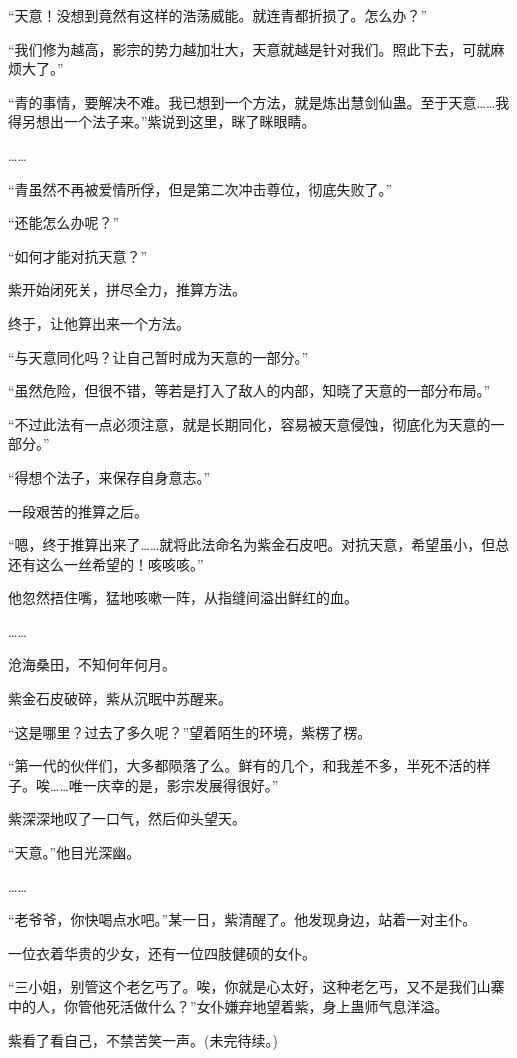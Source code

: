 \begin{this_body}
“天意！没想到竟然有这样的浩荡威能。就连青都折损了。怎么办？”

“我们修为越高，影宗的势力越加壮大，天意就越是针对我们。照此下去，可就麻烦大了。”

“青的事情，要解决不难。我已想到一个方法，就是炼出慧剑仙蛊。至于天意……我得另想出一个法子来。”紫说到这里，眯了眯眼睛。

……

“青虽然不再被爱情所俘，但是第二次冲击尊位，彻底失败了。”

“还能怎么办呢？”

“如何才能对抗天意？”

紫开始闭死关，拼尽全力，推算方法。

终于，让他算出来一个方法。

“与天意同化吗？让自己暂时成为天意的一部分。”

“虽然危险，但很不错，等若是打入了敌人的内部，知晓了天意的一部分布局。”

“不过此法有一点必须注意，就是长期同化，容易被天意侵蚀，彻底化为天意的一部分。”

“得想个法子，来保存自身意志。”

一段艰苦的推算之后。

“嗯，终于推算出来了……就将此法命名为紫金石皮吧。对抗天意，希望虽小，但总还有这么一丝希望的！咳咳咳。”

他忽然捂住嘴，猛地咳嗽一阵，从指缝间溢出鲜红的血。

……

沧海桑田，不知何年何月。

紫金石皮破碎，紫从沉眠中苏醒来。

“这是哪里？过去了多久呢？”望着陌生的环境，紫楞了楞。

“第一代的伙伴们，大多都陨落了么。鲜有的几个，和我差不多，半死不活的样子。唉……唯一庆幸的是，影宗发展得很好。”

紫深深地叹了一口气，然后仰头望天。

“天意。”他目光深幽。

……

“老爷爷，你快喝点水吧。”某一日，紫清醒了。他发现身边，站着一对主仆。

一位衣着华贵的少女，还有一位四肢健硕的女仆。

“三小姐，别管这个老乞丐了。唉，你就是心太好，这种老乞丐，又不是我们山寨中的人，你管他死活做什么？”女仆嫌弃地望着紫，身上蛊师气息洋溢。

紫看了看自己，不禁苦笑一声。(未完待续。)

\end{this_body}

